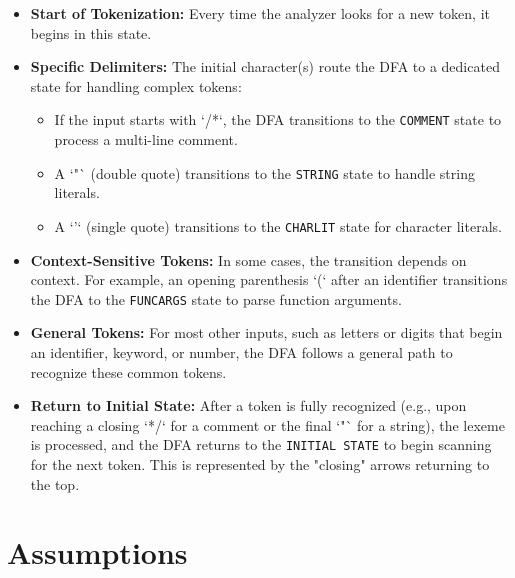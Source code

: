 \documentclass[12pt,a4paper]{article}
\begin{document}
\begin{itemize}
    \item \textbf{Start of Tokenization:} Every time the analyzer looks for a new token, it begins in this state.

    \item \textbf{Specific Delimiters:} The initial character(s) route the DFA to a dedicated state for handling complex tokens:
    \begin{itemize}
        \item If the input starts with `/*`, the DFA transitions to the \texttt{COMMENT} state to process a multi-line comment.
        \item A `"` (double quote) transitions to the \texttt{STRING} state to handle string literals.
        \item A `'` (single quote) transitions to the \texttt{CHARLIT} state for character literals.
    \end{itemize}

    \item \textbf{Context-Sensitive Tokens:} In some cases, the transition depends on context. For example, an opening parenthesis `(` after an identifier transitions the DFA to the \texttt{FUNCARGS} state to parse function arguments.

    \item \textbf{General Tokens:} For most other inputs, such as letters or digits that begin an identifier, keyword, or number, the DFA follows a general path to recognize these common tokens.

    \item \textbf{Return to Initial State:} After a token is fully recognized (e.g., upon reaching a closing `*/` for a comment or the final `"` for a string), the lexeme is processed, and the DFA returns to the \texttt{INITIAL STATE} to begin scanning for the next token. This is represented by the "closing" arrows returning to the top.
\end{itemize}

\vspace{0.5cm}

\section{Assumptions}
\end{document}
